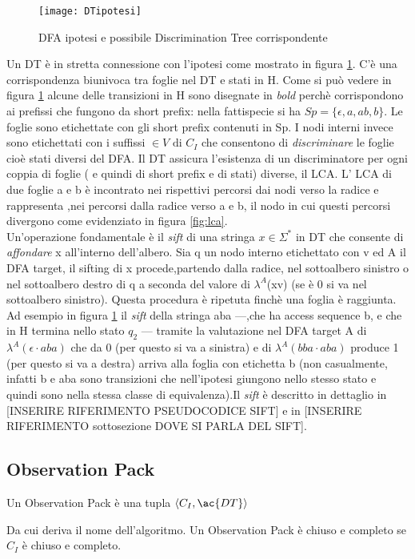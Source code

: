 \begin{figure}[htp]
	\centering
	\texttt{[image: DTipotesi]}
	\caption[Correlazione tra ipotesi e discrimination tree]{DFA ipotesi e possibile Discrimination Tree corrispondente}
   \label{fig:hdt}
\end{figure}
Un \ac{DT} è in stretta connessione con l'ipotesi come mostrato in figura \ref{fig:hdt}. C'è una corrispondenza biunivoca tra foglie nel \ac{DT} e stati in \ac{H}. Come si può vedere in figura  \ref{fig:hdt} alcune delle transizioni in \ac{H} sono disegnate in \textit{bold} perchè corrispondono ai prefissi che fungono da short prefix: nella fattispecie si ha $Sp=\{\epsilon,a,ab,b\}$. Le foglie sono etichettate con gli short prefix contenuti in Sp. I nodi interni invece sono etichettati con i suffissi $\in V \text{ di } C_I$ che consentono di \textit{discriminare} le foglie cioè stati diversi del \ac{DFA}. Il \ac{DT} assicura l'esistenza di un discriminatore per ogni coppia di foglie ( e quindi di short prefix e di stati) diverse, il \ac{LCA}. L' \ac{LCA} di due foglie a e b è incontrato nei rispettivi percorsi dai nodi verso la radice e rappresenta ,nei percorsi dalla radice verso a e b, il nodo in cui questi percorsi divergono come evidenziato in figura \ref{fig:lca}.\\Un'operazione fondamentale è il \textit{sift} di una stringa $x \in \Sigma^{*}$ in \ac{DT} che consente di \textit{affondare} x all'interno dell'albero. Sia q un nodo interno etichettato con v ed A il \ac{DFA} target, il sifting di x  procede,partendo dalla radice, nel sottoalbero sinistro o nel sottoalbero destro di q a seconda del valore di $\lambda^{A}$(xv) (se è 0 si va nel sottoalbero sinistro). Questa procedura è ripetuta finchè una foglia è raggiunta. Ad esempio in figura \ref{fig:hdt} il \textit{sift} della stringa aba ---,che ha access sequence b, e che in \ac{H} termina nello stato $q_2$ --- tramite la valutazione nel \ac{DFA} target A di $\lambda^{A}(\epsilon \cdot aba)$ che da 0 (per questo si va a sinistra) e di $\lambda^{A}(bba \cdot aba)$ produce 1 (per questo si va a destra)  arriva alla foglia con etichetta b (non casualmente, infatti b e aba sono transizioni che  nell'ipotesi giungono nello stesso stato e quindi sono nella stessa classe di equivalenza).Il \textit{sift} è descritto in dettaglio in [INSERIRE RIFERIMENTO PSEUDOCODICE SIFT] e in [INSERIRE RIFERIMENTO sottosezione DOVE SI PARLA DEL SIFT].

\subsection{Observation Pack}
\begin{definizione*}
Un Observation Pack è una tupla $\Braket{C_{I} , \ac{DT}}$
\end{definizione*}
Da cui deriva il nome dell'algoritmo. Un Observation Pack è chiuso e completo se $C_I$ è chiuso e completo.


